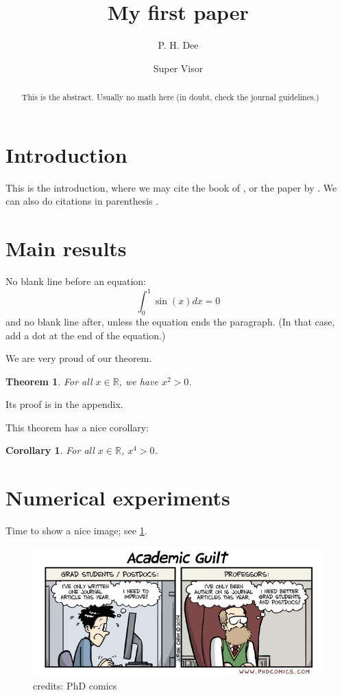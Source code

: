 \documentclass{scrartcl}  %
\newtheorem{thm}{Theorem}
\newtheorem{cor}{Corollary}
\newcommand{\R}{\mathbb{R}}
\begin{document}
\title{My first paper}
\author{P. H. Dee \and Super Visor}
\date{}  %
\maketitle

\begin{abstract}
  This is the abstract. Usually no math here (in doubt, check the journal
  guidelines.)
\end{abstract}

\section{Introduction}\label{sec:intro}

This is the introduction, where we may cite the book of \citet{book_sasha}, or
the paper by \citet{cristina_arxiv}.  We can also do citations in parenthesis
\citep{anna_mirror}.


\section{Main results}\label{sec:results}

No blank line before an equation:
\[ \int_0^1 \sin(x) dx = 0
\]
and no blank line after, unless the equation ends the paragraph. (In that case,
add a dot at the end of the equation.)

We are very proud of our theorem.
\begin{thm}
  For all $x \in \R$, we have $x^2 > 0$.
\end{thm}
Its proof is in the appendix.

This theorem has a nice corollary:
\begin{cor}
  For all $x \in \R$, $x^4 > 0$.
\end{cor}

\section{Numerical experiments}\label{sec:numerics}

Time to show a nice image; see \cref{fig:boxplot_first}.

\begin{figure}
  \begin{center}
    \includegraphics[scale=0.4]{figs/phd_guilt.jpg}
  \end{center}
  \caption{credits: PhD comics}
  \label{fig:boxplot_first}
\end{figure}
\end{document}
